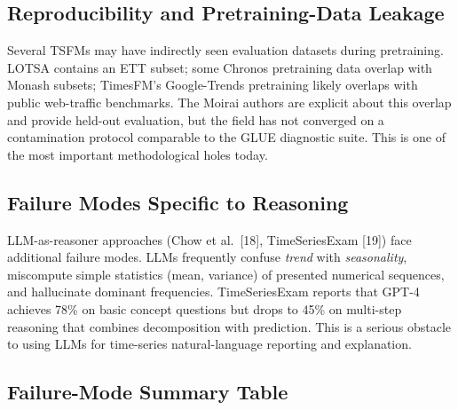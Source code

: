 \subsection{Reproducibility and Pretraining-Data Leakage}\label{reproducibility-and-pretraining-data-leakage}

Several TSFMs may have indirectly seen evaluation datasets during pretraining. LOTSA contains an ETT subset; some Chronos pretraining data overlap with Monash subsets; TimesFM's Google-Trends pretraining likely overlaps with public web-traffic benchmarks. The Moirai authors are explicit about this overlap and provide held-out evaluation, but the field has not converged on a contamination protocol comparable to the GLUE diagnostic suite. This is one of the most important methodological holes today.

\subsection{Failure Modes Specific to Reasoning}\label{failure-modes-specific-to-reasoning}

LLM-as-reasoner approaches (Chow et al.~{[}18{]}, TimeSeriesExam {[}19{]}) face additional failure modes. LLMs frequently confuse \emph{trend} with \emph{seasonality}, miscompute simple statistics (mean, variance) of presented numerical sequences, and hallucinate dominant frequencies. TimeSeriesExam reports that GPT-4 achieves 78\% on basic concept questions but drops to 45\% on multi-step reasoning that combines decomposition with prediction. This is a serious obstacle to using LLMs for time-series natural-language reporting and explanation.

\subsection{Failure-Mode Summary Table}\label{failure-mode-summary-table}


